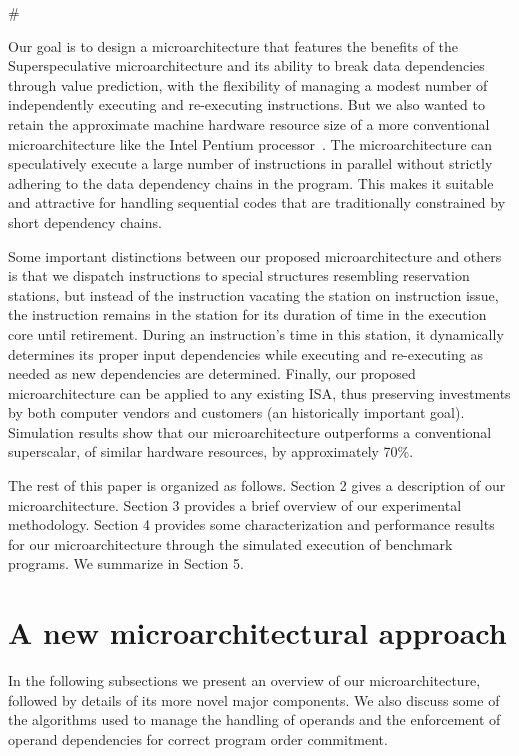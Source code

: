 #\documentclass[10pt,dvips]{article}
\begin{document}
Our goal is to design a microarchitecture
that features the benefits of the Superspeculative 
microarchitecture and its ability to break data
dependencies through value prediction, with the flexibility
of managing a modest number of independently executing and re-executing
instructions.
But we also wanted to retain the approximate machine hardware resource
size of a
more conventional microarchitecture like the
Intel Pentium processor~\cite{hinton01pentium}.
The microarchitecture can speculatively execute a large
number of instructions in parallel without strictly adhering to
the data dependency chains in the program.  This makes it
suitable and attractive for handling sequential codes that are
traditionally constrained by short dependency chains.

Some important distinctions between our proposed microarchitecture and
others is that we dispatch instructions to special structures
resembling reservation stations, but instead of the instruction
vacating the station on instruction issue, the instruction
remains in the station for its duration of time in the execution
core until retirement.  During an instruction's time in this
station, it dynamically determines its proper input dependencies
while executing and re-executing as needed as new dependencies
are determined.
Finally, our proposed microarchitecture can
be applied to any existing ISA, thus preserving investments
by both computer vendors and customers (an historically important goal).  
Simulation results show that our microarchitecture outperforms
a conventional superscalar, of similar hardware resources, by
approximately 70\%.

The rest of this paper is organized as follows.
Section 2 gives a description of our microarchitecture.
Section 3 provides a brief overview of our experimental methodology.
Section 4 provides some characterization and performance 
results for our microarchitecture through the simulated
execution of benchmark programs.
We summarize in Section 5.
%
\vspace{-0.15in}
\section{A new microarchitectural approach}
%
In the following subsections we present an
overview of our microarchitecture, followed by details
of its more novel major components.
We also discuss some of the algorithms used to manage
the handling of operands and the enforcement of
operand dependencies for correct program order commitment.
%
\end{document}
